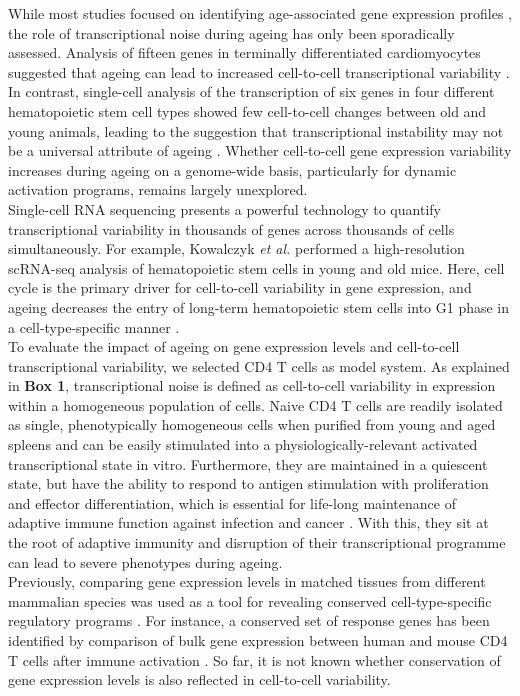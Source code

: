 While most studies focused on identifying age-associated gene expression profiles \citep{DeMagalhaes2009}, the role of transcriptional noise during ageing has only been sporadically assessed. Analysis of fifteen genes in terminally differentiated cardiomyocytes suggested that ageing can lead to increased cell-to-cell transcriptional variability \citep{Bahar2006}. In contrast, single-cell analysis of the transcription of six genes in four different hematopoietic stem cell types showed few cell-to-cell changes between old and young animals, leading to the suggestion that transcriptional instability may not be a universal attribute of ageing \citep{Warren2007}. Whether cell-to-cell gene expression variability increases during ageing on a genome-wide basis, particularly for dynamic activation programs, remains largely unexplored.\\

Single-cell RNA sequencing presents a powerful technology to quantify  transcriptional variability in thousands of genes across thousands of cells simultaneously. For example, Kowalczyk \textit{et al.} performed a high-resolution scRNA-seq analysis of hematopoietic stem cells in young and old mice. Here, cell cycle is the primary driver for cell-to-cell variability in gene expression, and ageing decreases the entry of long-term hematopoietic stem cells into G1 phase in a cell-type-specific manner \citep{Kowalczyk2015}.\\ 

To evaluate the impact of ageing on gene expression levels and cell-to-cell transcriptional variability, we selected CD4\plus{} T cells as model system. As explained in \textbf{Box 1}, transcriptional noise is defined as cell-to-cell variability in expression within a homogeneous population of cells. Naive CD4\plus{} T cells are readily isolated as single, phenotypically homogeneous cells when purified from young and aged spleens and can be easily stimulated into a physiologically-relevant activated transcriptional state in vitro. Furthermore, they are maintained in a quiescent state, but have the ability to respond to antigen stimulation with proliferation and effector differentiation, which is essential for life-long maintenance of adaptive immune function against infection and cancer \citep{Swain2012, Kim2014a}. With this, they sit at the root of adaptive immunity and disruption of their transcriptional programme can lead to severe phenotypes during ageing. \\

Previously, comparing gene expression levels in matched tissues from different mammalian species was used as a tool for revealing conserved cell-type-specific regulatory programs \citep{Sudmant2015, Finseth2014, Brawand2011, Flajnik2009}. For instance, a conserved set of response genes has been identified by comparison of bulk gene expression between human and mouse CD4\plus{} T cells after immune activation \citep{Shay2013}. So far, it is not known whether conservation of gene expression levels is also reflected in cell-to-cell variability.\\

